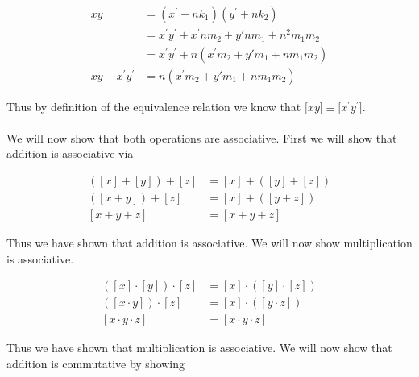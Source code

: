 \documentclass{article}
\begin{document}
        \begin{equation*}
          \begin{split}
            xy &= (x^{\prime} + nk_1)(y^{\prime} + nk_2)\\
            &= x^{\prime}y^{\prime} + x^{\prime} n m_2 + y{\prime}nm_1 + n^2m_1m_2\\
            &= x^{\prime}y^{\prime} + n(x^{\prime}m_2 + y{\prime}m_1 + nm_1m_2)\\
            xy - x^{\prime}y^{\prime} &= n(x^{\prime}m_2 + y{\prime}m_1 + nm_1m_2)
          \end{split}
        \end{equation*}

        Thus by definition of the equivalence relation we know that $\lbrack xy \rbrack \equiv \lbrack x^{\prime}y^{\prime} \rbrack$.

        \paragraph{}
        We will now show that both operations are associative. First we will show that addition is associative via

        
        \begin{equation*}
          \begin{split}
            ([x] + [y]) + [z] &= [x] + ([y] + [z])\\
            ([x + y]) + [z] &= [x] + ([y + z])\\
            [x+y+z] &= [x+y+z]
          \end{split}
        \end{equation*}

        Thus we have shown that addition is associative. We will now show multiplication is associative.


        \begin{equation*}
          \begin{split}
            ([x] \cdot [y]) \cdot [z] &= [x] \cdot ([y] \cdot [z])\\
            ([x \cdot y]) \cdot [z] &= [x] \cdot ([y \cdot z])\\
            [x \cdot y \cdot z] &= [x\cdot y \cdot z]
          \end{split}
        \end{equation*}

        Thus we have shown that multiplication is associative. We will now show that addition is commutative by showing
\end{document}
